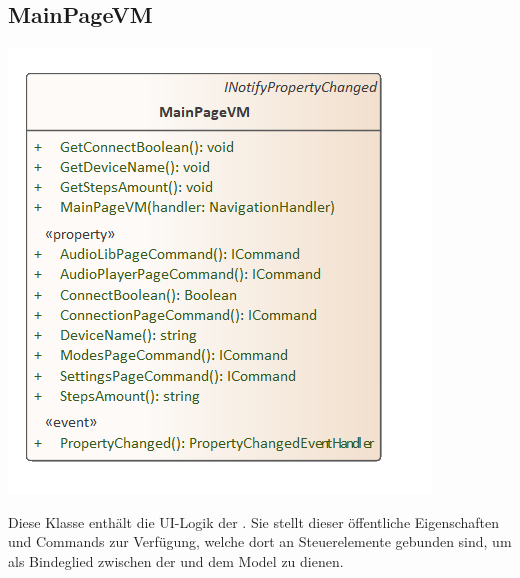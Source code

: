 \documentclass[../entwurf.tex]{subfiles}
\begin{document}
\subsection{MainPageVM}
\begin{minipage}{0.5\textwidth}
\includegraphics[scale=0.75]{../graphics/vm_klassen/MainPageVM.png}
\end{minipage}
\begin{minipage}{0.5\textwidth}
 \newline
Diese Klasse enthält die UI-Logik der . Sie stellt dieser öffentliche Eigenschaften und Commands zur Verfügung, welche dort an Steuerelemente gebunden sind, um als Bindeglied zwischen der  und dem Model zu dienen.
\end{minipage}
\end{document}
